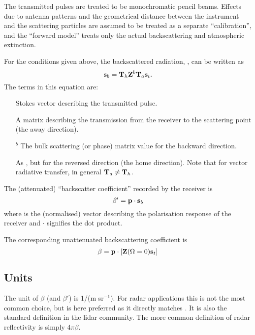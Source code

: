 The transmitted pulses are treated to be monochromatic pencil beams. Effects
due to antenna patterns and the geometrical distance between the instrument and
the scattering particles are assumed to be treated as a separate
``calibration'', and the ``forward model'' treats only the actual
backscattering and atmospheric extinction. 

For the conditions given above, the backscattered radiation, , can be
written as
\begin{equation}
  \label{eq:cradar:bscatt1}
  {\bf s}_{b} = {\bf T}_{h}{\bf Z}^b{\bf T}_{a}{\bf s}_{t}.
\end{equation}
The terms in this equation are:
\begin{itemize}
\item[\aStoVec{t}] Stokes vector describing the transmitted pulse.
\item[\aTraMat{a}] A matrix describing the transmission from the receiver to
  the scattering point (the away direction). 
\item[\PhaMat$^b$] The bulk scattering (or phase) matrix value
  for the backward direction.
\item[\aTraMat{h}] As , but for the reversed direction (the home
  direction). Note that for vector radiative transfer, in general
  ${\bf T}_{a}\neq{\bf T}_{h}$.
\end{itemize}
The (attenuated) ``backscatter coefficient'' recorded by the receiver is
\begin{equation}
  \label{eq:cradar:bscatt2}
  \beta' = \mathbf{p} \cdot {\bf s}_{b} 
\end{equation}
where  is the (normalised) vector describing the polarisation
response of the receiver and $\cdot$ signifies the dot product.

The corresponding unattenuated backscattering coefficient is
\begin{equation}
  \label{eq:cradar:bscatt3}
  \beta = \mathbf{p} \cdot \left[{\bf Z}(\Omega=0){\bf s}_{t}\right]
\end{equation}


\subsection{Units}
\label{sec:cradar:units}

The unit of $\beta$ (and $\beta'$) is 1/(m sr$^{-1}$). For radar applications
this is not the most common choice, but is here preferred as it directly
matches \PhaMat. It is also the standard definition in the lidar community. The
more common definition of radar reflectivity is simply $4\pi\beta$.


